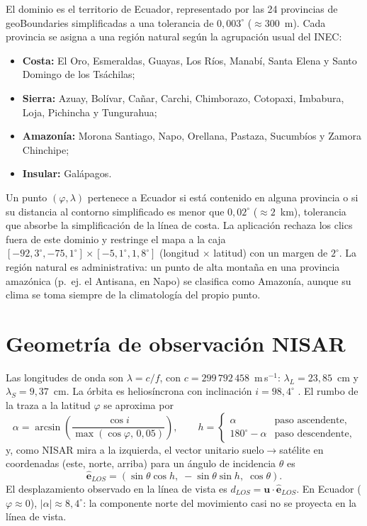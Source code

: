 \documentclass[11pt,a4paper]{article}
\newcommand{\vect}[1]{\mathbf{#1}}
\begin{document}
El dominio es el territorio de Ecuador, representado por las 24 provincias de geoBoundaries
\cite{runfola2020} simplificadas a una tolerancia de $0{,}003^\circ$ ($\approx 300$~m). Cada provincia se
asigna a una región natural según la agrupación usual del INEC:
\begin{itemize}
  \item \textbf{Costa:} El Oro, Esmeraldas, Guayas, Los Ríos, Manabí, Santa Elena y Santo Domingo de los
        Tsáchilas;
  \item \textbf{Sierra:} Azuay, Bolívar, Cañar, Carchi, Chimborazo, Cotopaxi, Imbabura, Loja, Pichincha y
        Tungurahua;
  \item \textbf{Amazonía:} Morona Santiago, Napo, Orellana, Pastaza, Sucumbíos y Zamora Chinchipe;
  \item \textbf{Insular:} Galápagos.
\end{itemize}
Un punto $(\varphi,\lambda)$ pertenece a Ecuador si está contenido en alguna provincia o si su distancia
al contorno simplificado es menor que $0{,}02^\circ$ ($\approx 2$~km), tolerancia que absorbe la
simplificación de la línea de costa. La aplicación rechaza los clics fuera de este dominio y restringe el
mapa a la caja $[-92{,}3^\circ, -75{,}1^\circ]\times[-5{,}1^\circ, 1{,}8^\circ]$ (longitud $\times$
latitud) con un margen de $2^\circ$. La región natural es administrativa: un punto de alta montaña en
una provincia amazónica (p.~ej. el Antisana, en Napo) se clasifica como Amazonía, aunque su clima se
toma siempre de la climatología del propio punto.

\section{Geometría de observación NISAR}

Las longitudes de onda son $\lambda = c/f$, con $c = 299\,792\,458$~m\,s$^{-1}$:
$\lambda_L = 23{,}85$~cm y $\lambda_S = 9{,}37$~cm. La órbita es heliosíncrona con inclinación
$i = 98{,}4^\circ$ \cite{nisar2018}. El rumbo de la traza a la latitud $\varphi$ se aproxima por
\begin{equation}
  \alpha = \arcsin\!\left(\frac{\cos i}{\max(\cos\varphi,\, 0{,}05)}\right),\qquad
  h = \begin{cases} \alpha & \text{paso ascendente},\\ 180^\circ - \alpha & \text{paso descendente},\end{cases}
\end{equation}
y, como NISAR mira a la izquierda, el vector unitario suelo$\to$satélite en coordenadas (este, norte,
arriba) para un ángulo de incidencia $\theta$ es
\begin{equation}
  \hat{\vect e}_{LOS} = (\sin\theta\cos h,\; -\sin\theta\sin h,\; \cos\theta).
\end{equation}
El desplazamiento observado en la línea de vista es $d_{LOS} = \vect u\cdot\hat{\vect e}_{LOS}$. En
Ecuador ($\varphi\approx 0$), $|\alpha|\approx 8{,}4^\circ$: la componente norte del movimiento casi no se
proyecta en la línea de vista.
\end{document}
